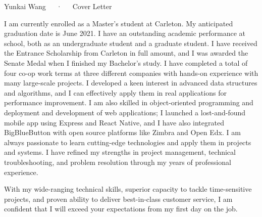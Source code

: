\documentclass[11pt, letterpaper]{awesome-cv}
\begin{document}
\makecvheader[C]

\makecvfooter
  {}
  {Yunkai Wang~~~·~~~Cover Letter}
  {}  

\makelettertitle

\begin{cvletter}

I am currently enrolled as a Master's student at Carleton. My anticipated graduation date is June 2021.
I have an outstanding academic performance at school, both as an undergraduate student and a
graduate student. I have received the Entrance Scholarship from Carleton in full amount, and I was
awarded the Senate Medal when I finished my Bachelor's study. I have completed a total of
four co-op work terms at three different companies with hands-on experience with many large-scale
projects. I developed a keen interest in advanced data structures and algorithms, and I can effectively
apply them in real applications for performance improvement. I am also skilled in object-oriented
programming and deployment and development of web applications; I launched a lost-and-found
mobile app using Express and React Native, and I have also integrated BigBlueButton with open
source platforms like Zimbra and Open Edx. I am always passionate to learn cutting-edge technologies
and apply them in projects and systems. I have refined my strengths in project management,
technical troubleshooting, and problem resolution through my years of professional experience.




With my wide-ranging technical skills, superior capacity to tackle time-sensitive projects, and proven
ability to deliver best-in-class customer service, I am confident that I will exceed your expectations
from my first day on the job.

\end{cvletter}

\makeletterclosing
\end{document}

